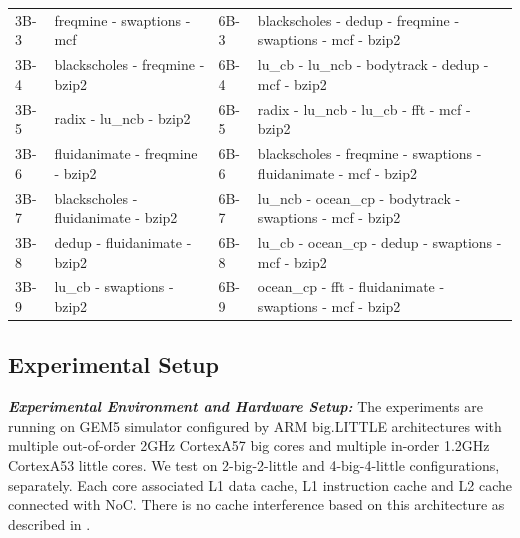 \documentclass[sigplan,review,anonymous]{acmart}\settopmatter{printfolios=true,printccs=false,printacmref=false}
\begin{document}
\begin{table}
{\begin{tabular}{p{1.5cm} |p{5.5cm} || p{1.5cm} |p{9cm} }
    3B-3 &freqmine - swaptions - mcf &6B-3 &blackscholes - dedup - freqmine - swaptions - mcf - bzip2\\
    3B-4 &blackscholes - freqmine - bzip2 &6B-4 &lu\_cb - lu\_ncb - bodytrack - dedup - mcf - bzip2\\
    3B-5 &radix - lu\_ncb - bzip2 &6B-5 &radix - lu\_ncb - lu\_cb - fft - mcf - bzip2\\
    3B-6 &fluidanimate - freqmine - bzip2 &6B-6 &blackscholes - freqmine - swaptions - fluidanimate - mcf - bzip2\\
    3B-7 &blackscholes - fluidanimate - bzip2 &6B-7 &lu\_ncb - ocean\_cp - bodytrack - swaptions - mcf - bzip2\\
    3B-8 &dedup - fluidanimate - bzip2 &6B-8 &lu\_cb - ocean\_cp - dedup - swaptions - mcf - bzip2\\
    3B-9 &lu\_cb - swaptions - bzip2 &6B-9 &ocean\_cp - fft - fluidanimate - swaptions - mcf - bzip2\\
    \bottomrule
  \end{tabular}}
\end{table}
\subsection{Experimental Setup}
\textbf{\textit{Experimental Environment and Hardware Setup:}} The experiments are running on GEM5 simulator configured by ARM big.LITTLE architectures with multiple out-of-order 2GHz CortexA57 big cores and multiple in-order 1.2GHz CortexA53 little cores. We test on 2-big-2-little and 4-big-4-little configurations, separately. Each core associated L1 data cache, L1 instruction cache and L2 cache connected with NoC. There is no cache interference based on this architecture as described in \cite{kim2018exploring}.
\end{document}
